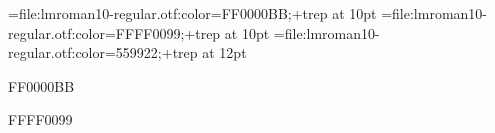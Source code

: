 

\font\testa=file:lmroman10-regular.otf:color=FF0000BB;+trep at 10pt
\font\testb=file:lmroman10-regular.otf:color=FFFF0099;+trep at 10pt
\font\testc=file:lmroman10-regular.otf:color=559922;+trep   at 12pt

\testa FF0000BB \par
\testb FFFF0099 \par
{} \par
\bye
